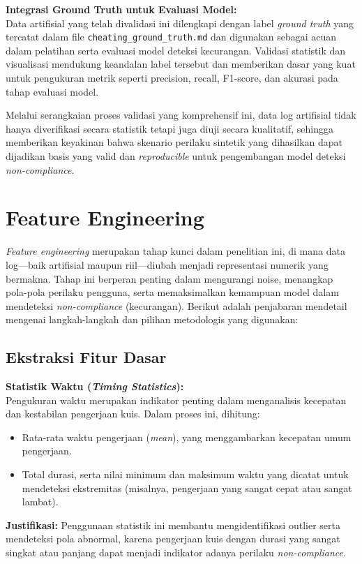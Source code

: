 \textbf{Integrasi Ground Truth untuk Evaluasi Model:} \\
Data artifisial yang telah divalidasi ini dilengkapi dengan label \textit{ground truth} yang tercatat dalam file \texttt{cheating\_ground\_truth.md} dan digunakan sebagai acuan dalam pelatihan serta evaluasi model deteksi kecurangan. Validasi statistik dan visualisasi mendukung keandalan label tersebut dan memberikan dasar yang kuat untuk pengukuran metrik seperti precision, recall, F1-score, dan akurasi pada tahap evaluasi model.

Melalui serangkaian proses validasi yang komprehensif ini, data log artifisial tidak hanya diverifikasi secara statistik tetapi juga diuji secara kualitatif, sehingga memberikan keyakinan bahwa skenario perilaku sintetik yang dihasilkan dapat dijadikan basis yang valid dan \textit{reproducible} untuk pengembangan model deteksi \textit{non-compliance}.

\section{Feature Engineering}
\label{sec:featureEngineering}
\textit{Feature engineering} merupakan tahap kunci dalam penelitian ini, di mana data log—baik artifisial maupun riil—diubah menjadi representasi numerik yang bermakna. Tahap ini berperan penting dalam mengurangi noise, menangkap pola-pola perilaku pengguna, serta memaksimalkan kemampuan model dalam mendeteksi \textit{non-compliance} (kecurangan). Berikut adalah penjabaran mendetail mengenai langkah-langkah dan pilihan metodologis yang digunakan:

\subsection{Ekstraksi Fitur Dasar}
\label{sec:ekstraksiFiturDasar}
\textbf{Statistik Waktu (\textit{Timing Statistics}):} \\
Pengukuran waktu merupakan indikator penting dalam menganalisis kecepatan dan kestabilan pengerjaan kuis. Dalam proses ini, dihitung:
\begin{itemize}
    \item Rata-rata waktu pengerjaan (\textit{mean}), yang menggambarkan kecepatan umum pengerjaan.
    \item Total durasi, serta nilai minimum dan maksimum waktu yang dicatat untuk mendeteksi ekstremitas (misalnya, pengerjaan yang sangat cepat atau sangat lambat).
\end{itemize}
\textbf{Justifikasi:} Penggunaan statistik ini membantu mengidentifikasi outlier serta mendeteksi pola abnormal, karena pengerjaan kuis dengan durasi yang sangat singkat atau panjang dapat menjadi indikator adanya perilaku \textit{non-compliance}.

